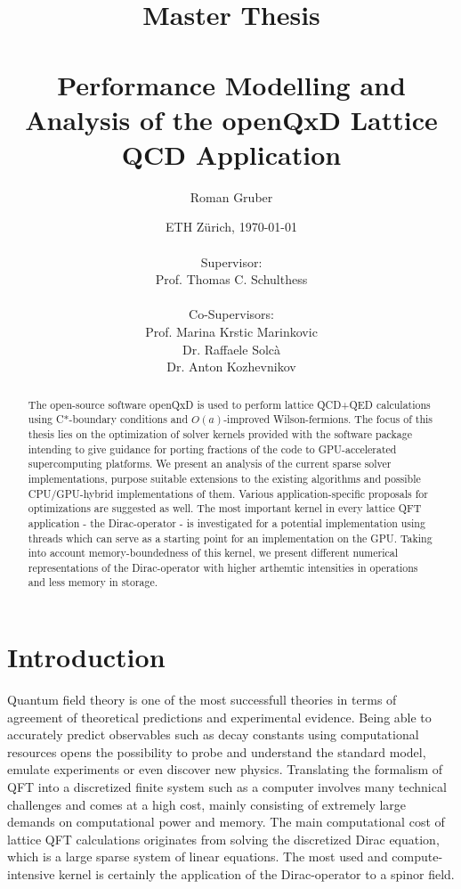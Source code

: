 \documentclass{article}
\title{Master Thesis \\~\\ Performance Modelling and Analysis of the openQxD Lattice QCD Application}
\author{Roman Gruber}
\date{ETH Zürich, \today \\~\\ Supervisor: \\ Prof. Thomas C. Schulthess \\~\\ Co-Supervisors: \\ Prof. Marina Krstic Marinkovic \\ Dr. Raffaele Solcà \\ Dr. Anton Kozhevnikov}
\theoremstyle{plain} %
\theoremstyle{convention} %
\theoremstyle{remark} %
\numberwithin{equation}{section}
\begin{document}
\maketitle

\begin{abstract}

The open-source software openQxD is used to perform lattice QCD+QED calculations using C*-boundary conditions and $O(a)$-improved Wilson-fermions. The focus of this thesis lies on the optimization of solver kernels provided with the software package intending to give guidance for porting fractions of the code to GPU-accelerated supercomputing platforms. We present an analysis of the current sparse solver implementations, purpose suitable extensions to the existing algorithms and possible CPU/GPU-hybrid implementations of them.  Various application-specific proposals for optimizations are suggested as well. The most important kernel in every lattice QFT application - the Dirac-operator - is investigated for a potential implementation using threads which can serve as a starting point for an implementation on the GPU. Taking into account memory-boundedness of this kernel, we present different numerical representations of the Dirac-operator with higher arthemtic intensities in operations and less memory in storage.

\end{abstract}

\doclicenseThis

\newpage

\tableofcontents

\newpage

\section{Introduction}

Quantum field theory is one of the most successfull theories in terms of agreement of theoretical predictions and experimental evidence. Being able to accurately predict observables such as decay constants using computational resources opens the possibility to probe and understand the standard model, emulate experiments or even discover new physics. Translating the formalism of QFT into a discretized finite system such as a computer involves many technical challenges and comes at a high cost, mainly consisting of extremely large demands on computational power and memory. The main computational cost of lattice QFT calculations originates from solving the discretized Dirac equation, which is a large sparse system of linear equations. The most used and compute-intensive kernel is certainly the application of the Dirac-operator to a spinor field.
\end{document}
